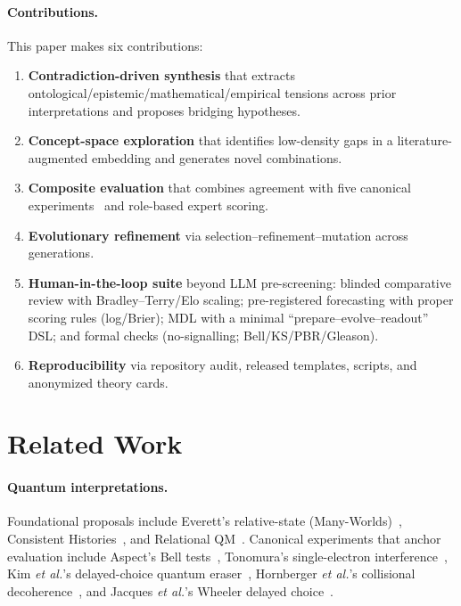 \documentclass[11pt]{article}
\begin{document}
\paragraph{Contributions.} This paper makes six contributions:
\begin{sloppypar}
\begin{enumerate}[leftmargin=2em]
  \item \textbf{Contradiction-driven synthesis} that extracts ontological/\allowbreak epistemic/\allowbreak mathematical/\allowbreak empirical tensions across prior interpretations and proposes bridging hypotheses.
  \item \textbf{Concept-space exploration} that identifies low-density gaps in a literature-augmented embedding and generates novel combinations.
  \item \textbf{Composite evaluation} that combines agreement with five canonical experiments~\cite{Aspect1982,Tonomura1989,Kim2000,Hornberger2003,Jacques2007} and role-based expert scoring.
  \item \textbf{Evolutionary refinement} via selection--refinement--mutation across generations.
  \item \textbf{Human-in-the-loop suite} beyond LLM pre-screening: blinded comparative review with Bradley--Terry/\allowbreak Elo scaling; pre-registered forecasting with proper scoring rules (log/\allowbreak Brier); MDL with a minimal ``prepare--evolve--readout'' DSL; and formal checks (no-signalling; Bell/\allowbreak KS/\allowbreak PBR/\allowbreak Gleason).
  \item \textbf{Reproducibility} via repository audit, released templates, scripts, and anonymized theory cards.
\end{enumerate}
\end{sloppypar}

\section{Related Work}
\paragraph{Quantum interpretations.} Foundational proposals include Everett's relative-state (Many-Worlds)~\cite{Everett1957}, Consistent Histories~\cite{Griffiths1984}, and Relational QM~\cite{Rovelli1996}. Canonical experiments that anchor evaluation include Aspect's Bell tests~\cite{Aspect1982}, Tonomura's single-electron interference~\cite{Tonomura1989}, Kim \emph{et al.}'s delayed-choice quantum eraser~\cite{Kim2000}, Hornberger \emph{et al.}'s collisional decoherence~\cite{Hornberger2003}, and Jacques \emph{et al.}'s Wheeler delayed choice~\cite{Jacques2007}.
\end{document}
